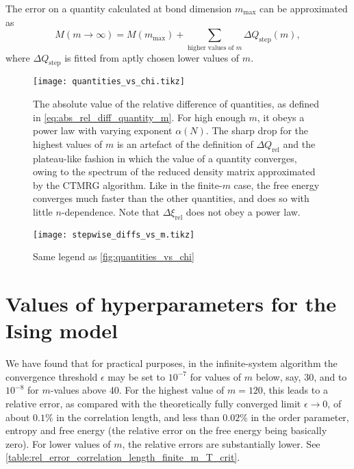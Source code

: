 The error on a quantity calculated at bond dimension $m_{\text{max}}$ can be approximated as
\begin{equation}\label{eq:extrapolation_finite_N}
  M(m \to \infty) = M(m_{\text{max}}) + \sum_{\text{higher values of $m$}} \Delta Q_{\text{step}}(m),
\end{equation}
where $\Delta Q_{\text{step}}$ is fitted from aptly chosen lower values of $m$.

\begin{figure}
  \texttt{[image: quantities\_vs\_chi.tikz]}
  \caption{The absolute value of the relative difference of quantities, as defined in \autoref{eq:abs_rel_diff_quantity_m}.
  For high enough $m$, it obeys a power law with varying exponent $\alpha(N)$.
  The sharp drop for the highest values of $m$ is an artefact of the definition of $\Delta Q_{\text{rel}}$ and the
  plateau-like fashion in which the value of a quantity converges,
  owing to the spectrum of the reduced density matrix approximated by the CTMRG algorithm.
  Like in the finite-$m$ case, the free energy converges much faster than the other quantities,
  and does so with little $n$-dependence.
  Note that $\Delta \xi_{\text{rel}}$ does not obey a power law.}\label{fig:quantities_vs_chi}
\end{figure}

\begin{figure}
  \texttt{[image: stepwise\_diffs\_vs\_m.tikz]}
  \caption{Same legend as \autoref{fig:quantities_vs_chi}}\label{fig:stepwise_diffs_vs_m}
\end{figure}


\section{Values of hyperparameters for the Ising model}
We have found that for practical purposes, in the infinite-system algorithm the convergence threshold $\epsilon$ may be
set to $10^{-7}$ for values of $m$ below, say, 30, and to $10^{-8}$ for $m$-values above 40.
For the highest value of $m = 120$, this leads to a relative error,
as compared with the theoretically fully converged limit $\epsilon \to 0$,
of about $0.1\%$ in the correlation length, and less than $0.02\%$ in the order parameter,
entropy and free energy (the relative error on the free energy being basically zero).
For lower values of $m$, the relative errors are substantially lower.
See \autoref{table:rel_error_correlation_length_finite_m_T_crit}.


